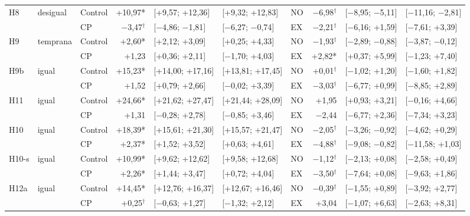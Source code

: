 \begin{table}[H]
{\begin{tabular}{@{}l l l r l l | l r l l@{}}
H8 & desigual & Control & +10{,}97* & [+9{,}57; +12{,}36] & [+9{,}32; +12{,}83] & NO & $-$6{,}98$^\dagger$ & [$-$8{,}95; $-$5{,}11] & [$-$11{,}16; $-$2{,}81] \\
 & & CP & $-$3{,}47$^\dagger$ & [$-$4{,}86; $-$1{,}81] & [$-$6{,}27; $-$0{,}74] & EX & $-$2{,}21$^\dagger$ & [$-$6{,}16; +1{,}59] & [$-$7{,}61; +3{,}39] \\
H9 & temprana & Control & +2{,}60* & [+2{,}12; +3{,}09] & [+0{,}25; +4{,}33] & NO & $-$1{,}93$^\dagger$ & [$-$2{,}89; $-$0{,}88] & [$-$3{,}87; $-$0{,}12] \\
 & & CP & +1{,}23 & [+0{,}36; +2{,}11] & [$-$1{,}70; +4{,}03] & EX & +2{,}82* & [+0{,}37; +5{,}99] & [$-$1{,}23; +7{,}40] \\
H9b & igual & Control & +15{,}23* & [+14{,}00; +17{,}16] & [+13{,}81; +17{,}45] & NO & +0{,}01$^\dagger$ & [$-$1{,}02; +1{,}20] & [$-$1{,}60; +1{,}82] \\
 & & CP & +1{,}52 & [+0{,}79; +2{,}66] & [$-$0{,}02; +3{,}39] & EX & $-$3{,}03$^\dagger$ & [$-$6{,}77; +0{,}99] & [$-$8{,}85; +2{,}89] \\
H11 & igual & Control & +24{,}66* & [+21{,}62; +27{,}47] & [+21{,}44; +28{,}09] & NO & +1{,}95 & [+0{,}93; +3{,}21] & [$-$0{,}16; +4{,}66] \\
 & & CP & +1{,}31 & [$-$0{,}28; +2{,}78] & [$-$0{,}85; +3{,}46] & EX & $-$2{,}44 & [$-$6{,}77; +2{,}36] & [$-$7{,}34; +3{,}23] \\
H10 & igual & Control & +18{,}39* & [+15{,}61; +21{,}30] & [+15{,}57; +21{,}47] & NO & $-$2{,}05$^\dagger$ & [$-$3{,}26; $-$0{,}92] & [$-$4{,}62; +0{,}29] \\
 & & CP & +2{,}37* & [+1{,}52; +3{,}52] & [+0{,}63; +4{,}61] & EX & $-$4{,}88$^\dagger$ & [$-$9{,}08; $-$0{,}82] & [$-$11{,}58; +1{,}03] \\
H10-s & igual & Control & +10{,}99* & [+9{,}62; +12{,}62] & [+9{,}58; +12{,}68] & NO & $-$1{,}12$^\dagger$ & [$-$2{,}13; +0{,}08] & [$-$2{,}58; +0{,}49] \\
 & & CP & +2{,}26* & [+1{,}44; +3{,}47] & [+0{,}72; +4{,}04] & EX & $-$3{,}50$^\dagger$ & [$-$7{,}64; +0{,}08] & [$-$9{,}63; +1{,}86] \\
H12a & igual & Control & +14{,}45* & [+12{,}76; +16{,}37] & [+12{,}67; +16{,}46] & NO & $-$0{,}39$^\dagger$ & [$-$1{,}55; +0{,}89] & [$-$3{,}92; +2{,}77] \\
 & & CP & +0{,}25$^\dagger$ & [$-$0{,}63; +1{,}27] & [$-$1{,}32; +2{,}12] & EX & +3{,}04 & [$-$1{,}07; +6{,}63] & [$-$2{,}63; +8{,}31] \\

\end{tabular}}
\end{table}
